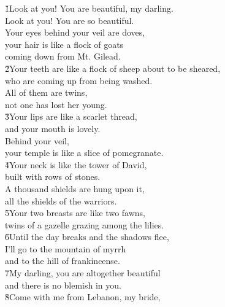 \begin{poetry}
\poeml {}
\v{1}Look at you! You are beautiful, my darling. \\
\poeml Look at you! You are so beautiful. \\
\poeml Your eyes behind your veil are doves, \\
\poemll    your hair is like a flock of goats \\
\poemlll       coming down from Mt. Gilead. \\
\poeml \v{2}Your teeth are like a flock of sheep about to be sheared, \\
\poemll    who are coming up from being washed. \\
\poeml All of them are twins, \\
\poemll    not one has lost her young. \\
\poeml \v{3}Your lips are like a scarlet thread, \\
\poemll    and your mouth is lovely. \\
\poeml Behind your veil, \\
\poemll    your temple is like a slice of pomegranate. \\
\poeml \v{4}Your neck is like the tower of David, \\
\poemll    built with rows of stones. \\
\poeml A thousand shields are hung upon it, \\
\poemll    all the shields of the warriors. \\
\poeml \v{5}Your two breasts are like two fawns, \\
\poemll    twins of a gazelle grazing among the lilies. \\
\poeml \v{6}Until the day breaks and the shadows flee, \\
\poemll    I'll go to the mountain of myrrh \\
\poemlll       and to the hill of frankincense. \\
\poeml \v{7}My darling, you are altogether beautiful \\
\poemll    and there is no blemish in you. \\
\poeml \v{8}Come with me from Lebanon, my bride, \\

\end{poetry}
